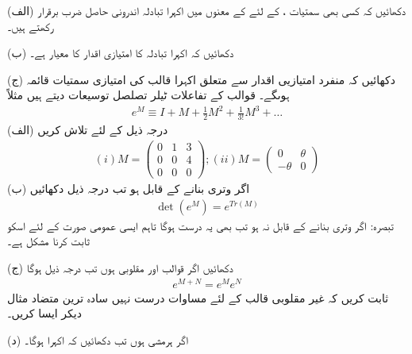 (الف) دکھائیں کہ کسی بھی سمتیات ،  کے لئے  کے معنوں میں  اکہرا تبادلہ اندرونی حاصل ضرب برقرار رکھتے ہیں۔

(ب) دکھائیں کہ اکہرا تبادلہ کا امتیازی اقدار کا معیار  ہے۔

(ج) دکھائیں کہ منفرد امتیازیی اقدار سے متعلق اکہرا قالب کی امتیازی سمتیات قائمہ ہوںگے۔
قوالب کے تفاعلات ٹیلر تصلصل توسیعات دیتے ہیں مثلاً 
\begin{align}
	e^M\equiv I + M +\frac{1}{2}M^2 + \frac{1}{3!}M^3 + \dots
\end{align}
(الف) درجہ ذیل کے لئے  تلاش کریں
\begin{align*}
	(i) M=
	\begin{pmatrix}
		0 & 1 & 3\\
		0 & 0 & 4\\
		0 & 0 & 0
	\end{pmatrix}
		; (ii) M=
	\begin{pmatrix}
		0 & \theta\\
		-\theta & 0
	\end{pmatrix}
\end{align*}
(ب) اگر  وتری بنانے کے قابل ہو تب درجہ ذیل دکھائیں
\begin{align}
	\det\left(e^M\right) = e^{Tr(M)}
\end{align}
تبصرہ: اگر  وتری بنانے کے قابل نہ ہو تب بھی یہ درست ہوگا تاہم ایسی عمومی صورت کے لئے اسکو ثابت کرنا مشکل ہے۔

(ج) دکھائیں اگر قوالب  اور  مقلوبی ہوں تب درجہ ذیل ہوگا
\begin{align}
	e^{M+N} = e^Me^N
\end{align}
ثابت کریں کہ غیر مقلوبی قالب کے لئے مساوات  درست نہیں سادہ ترین متضاد مثال دیکر ایسا کریں۔

(د) اگر  ہرمشی ہوں تب دکھائیں کہ اکہرا ہوگا۔
